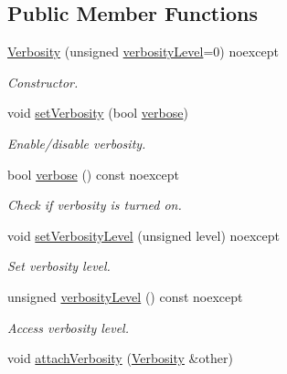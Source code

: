 \subsection*{Public Member Functions}
\begin{DoxyCompactItemize}
\item 
\hyperlink{classSpacy_1_1Mixin_1_1Verbosity_aefe2f237b0456c4bced001fbfa75f92e_aefe2f237b0456c4bced001fbfa75f92e}{Verbosity} (unsigned \hyperlink{classSpacy_1_1Mixin_1_1Verbosity_a2131f495d276c95d2d6534a6dfce6f9f_a2131f495d276c95d2d6534a6dfce6f9f}{verbosity\+Level}=0) noexcept
\begin{DoxyCompactList}\small\item\em Constructor. \end{DoxyCompactList}\item 
void \hyperlink{classSpacy_1_1Mixin_1_1Verbosity_a0365d293ab27e27da9496c668020aefb_a0365d293ab27e27da9496c668020aefb}{set\+Verbosity} (bool \hyperlink{classSpacy_1_1Mixin_1_1Verbosity_ad367a7328578546938fd2a7e52ab3793_ad367a7328578546938fd2a7e52ab3793}{verbose})
\begin{DoxyCompactList}\small\item\em Enable/disable verbosity. \end{DoxyCompactList}\item 
bool \hyperlink{classSpacy_1_1Mixin_1_1Verbosity_ad367a7328578546938fd2a7e52ab3793_ad367a7328578546938fd2a7e52ab3793}{verbose} () const noexcept
\begin{DoxyCompactList}\small\item\em Check if verbosity is turned on. \end{DoxyCompactList}\item 
void \hyperlink{classSpacy_1_1Mixin_1_1Verbosity_af84a4b3c933f252a5840ab63d4a38325_af84a4b3c933f252a5840ab63d4a38325}{set\+Verbosity\+Level} (unsigned level) noexcept
\begin{DoxyCompactList}\small\item\em Set verbosity level. \end{DoxyCompactList}\item 
unsigned \hyperlink{classSpacy_1_1Mixin_1_1Verbosity_a2131f495d276c95d2d6534a6dfce6f9f_a2131f495d276c95d2d6534a6dfce6f9f}{verbosity\+Level} () const noexcept
\begin{DoxyCompactList}\small\item\em Access verbosity level. \end{DoxyCompactList}\item 
void \hyperlink{classSpacy_1_1Mixin_1_1Verbosity_a69fe3a0107ec34780f1d74b46b1b53b5_a69fe3a0107ec34780f1d74b46b1b53b5}{attach\+Verbosity} (\hyperlink{classSpacy_1_1Mixin_1_1Verbosity}{Verbosity} \&other)

\end{DoxyCompactItemize}
